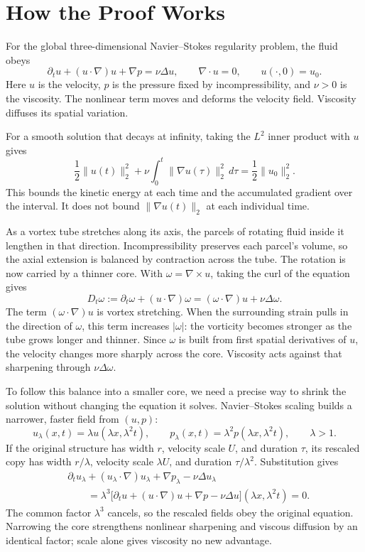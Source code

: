 \section*{How the Proof Works}

For the global three-dimensional Navier--Stokes regularity problem, the fluid
obeys
\[
\partial_tu+(u\!\cdot\nabla)u+\nabla p=\nu\Delta u,
\qquad
\nabla\!\cdot u=0,
\qquad
u(\cdot,0)=u_0.
\]
Here \(u\) is the velocity, \(p\) is the pressure fixed by incompressibility,
and \(\nu>0\) is the viscosity. The nonlinear term moves and deforms the
velocity field. Viscosity diffuses its spatial variation.

For a smooth solution that decays at infinity, taking the \(L^2\) inner product
with \(u\) gives
\[
\frac12\|u(t)\|_2^2
+\nu\int_0^t\|\nabla u(\tau)\|_2^2\,d\tau
=\frac12\|u_0\|_2^2.
\]
This bounds the kinetic energy at each time and the accumulated gradient over
the interval. It does not bound \(\|\nabla u(t)\|_2\) at each individual time.

As a vortex tube stretches along its axis, the parcels of rotating fluid
inside it lengthen in that direction. Incompressibility preserves each
parcel's volume, so the axial extension is balanced by contraction across the
tube. The rotation is now carried by a thinner core. With
\(\omega=\nabla\times u\), taking the curl of the equation gives
\[
D_t\omega
:=\partial_t\omega+(u\!\cdot\nabla)\omega
=(\omega\!\cdot\nabla)u+\nu\Delta\omega.
\]
The term \((\omega\!\cdot\nabla)u\) is vortex stretching. When the surrounding
strain pulls in the direction of \(\omega\), this term increases
\(|\omega|\): the vorticity becomes stronger as the tube grows longer and
thinner. Since \(\omega\) is built from first spatial derivatives of \(u\),
the velocity changes more sharply across the core. Viscosity acts against that
sharpening through \(\nu\Delta\omega\).

To follow this balance into a smaller core, we need a precise way to shrink the
solution without changing the equation it solves. Navier--Stokes scaling builds
a narrower, faster field from \((u,p)\):
\[
u_\lambda(x,t)=\lambda u(\lambda x,\lambda^2t),
\qquad
p_\lambda(x,t)=\lambda^2p(\lambda x,\lambda^2t),
\qquad
\lambda>1.
\]
If the original structure has width \(r\), velocity scale \(U\), and duration
\(\tau\), its rescaled copy has width \(r/\lambda\), velocity scale
\(\lambda U\), and duration \(\tau/\lambda^2\). Substitution gives
\[
\begin{aligned}
&\partial_tu_\lambda
+(u_\lambda\!\cdot\nabla)u_\lambda
+\nabla p_\lambda-\nu\Delta u_\lambda\\
&\qquad
=\lambda^3
\bigl[\partial_tu+(u\!\cdot\nabla)u+\nabla p-\nu\Delta u\bigr]
(\lambda x,\lambda^2t)
=0.
\end{aligned}
\]
The common factor \(\lambda^3\) cancels, so the rescaled fields obey the
original equation. Narrowing the core strengthens nonlinear sharpening and
viscous diffusion by an identical factor; scale alone gives viscosity no new
advantage.

